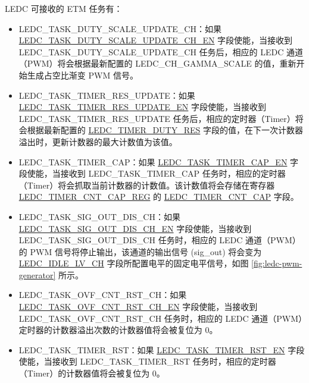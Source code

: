 \documentclass[main\_\_CN.tex]{subfiles}
\begin{document}
LEDC 可接收的 ETM 任务有：

\begin{itemize}
\item LEDC\_TASK\_DUTY\_SCALE\_UPDATE\_CH：如果 \hyperref[fielddesc:LEDCTASKDUTYSCALEUPDATECHNEN]{LEDC\_TASK\_DUTY\_SCALE\_UPDATE\_CH\_EN} 字段使能，当接收到 LEDC\_TASK\_DUTY\_SCALE\_UPDATE\_CH 任务后，相应的 LEDC 通道（PWM）将会根据最新配置的 LEDC\_CH\_GAMMA\_SCALE 的值，重新开始生成占空比渐变 PWM 信号。
\item LEDC\_TASK\_TIMER\_RES\_UPDATE：如果 \hyperref[fielddesc:LEDCTASKTIMERNRESUPDATEEN]{LEDC\_TASK\_TIMER\_RES\_UPDATE\_EN} 字段使能，当接收到 LEDC\_TASK\_TIMER\_RES\_UPDATE 任务后，相应的定时器（Timer）将会根据最新配置的 \hyperref[fielddesc:LEDCTIMERNDUTYRES]{LEDC\_TIMER\_DUTY\_RES} 字段的值，在下一次计数器溢出时，更新计数器的最大计数值为该值。
\item LEDC\_TASK\_TIMER\_CAP：如果 \hyperref[fielddesc:LEDCTASKTIMERNCAPEN]{LEDC\_TASK\_TIMER\_CAP\_EN} 字段使能，当接收到 LEDC\_TASK\_TIMER\_CAP 任务时，相应的定时器（Timer）将会抓取当前计数器的计数值。该计数值将会存储在寄存器 \hyperref[regdesc:LEDCTIMERNCNTCAPREG]{LEDC\_TIMER\_CNT\_CAP\_REG} 的 \hyperref[fielddesc:LEDCTIMERNCNTCAP]{LEDC\_TIMER\_CNT\_CAP} 字段。
\item LEDC\_TASK\_SIG\_OUT\_DIS\_CH：如果 \hyperref[fielddesc:LEDCTASKSIGOUTDISCHNEN]{LEDC\_TASK\_SIG\_OUT\_DIS\_CH\_EN} 字段使能，当接收到 LEDC\_TASK\_SIG\_OUT\_DIS\_CH 任务时，相应的 LEDC 通道（PWM）的 PWM 信号将停止输出，该通道的输出信号 (sig\_out) 将会变为 \hyperref[fielddesc:LEDCIDLELVCHN]{LEDC\_IDLE\_LV\_CH} 字段所配置电平的固定电平信号，如图 \ref{fig:ledc-pwm-generator} 所示。
\item LEDC\_TASK\_OVF\_CNT\_RST\_CH：如果 \hyperref[fielddesc:LEDCTASKOVFCNTRSTCHNEN]{LEDC\_TASK\_OVF\_CNT\_RST\_CH\_EN} 字段使能，当接收到 LEDC\_TASK\_OVF\_CNT\_RST\_CH 任务时，相应的 LEDC 通道（PWM）定时器的计数器溢出次数的计数器值将会被复位为 0。
\item LEDC\_TASK\_TIMER\_RST：如果 \hyperref[fielddesc:LEDCTASKTIMERNRSTEN]{LEDC\_TASK\_TIMER\_RST\_EN} 字段使能，当接收到 LEDC\_TASK\_TIMER\_RST 任务时，相应的定时器（Timer）的计数器值将会被复位为 0。

\end{itemize}
\end{document}
